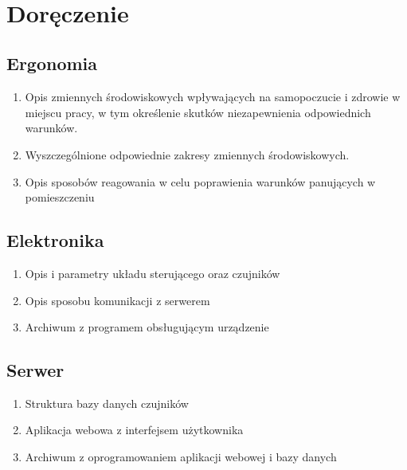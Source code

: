 \documentclass[10pt, a4paper]{article}
\begin{document}
\hspace{-50px}
\begin{ganttchart}{1}{28}
 \\
 \\
 \\
 \\
 \\
 \\
\end{ganttchart}


\section{Doręczenie}

\subsection{Ergonomia}
	\begin{enumerate}
	\item Opis zmiennych środowiskowych wpływających na samopoczucie i zdrowie w miejscu pracy, w tym określenie skutków niezapewnienia odpowiednich warunków.
	\item Wyszczególnione odpowiednie zakresy zmiennych środowiskowych.
	\item Opis sposobów reagowania w celu poprawienia warunków panujących w pomieszczeniu
	\end{enumerate}
\subsection{Elektronika}
	\begin{enumerate}
	\item Opis i parametry układu sterującego oraz czujników
	\item Opis sposobu komunikacji z serwerem
	\item Archiwum z programem obsługującym urządzenie
	\end{enumerate}
\subsection{Serwer}
	\begin{enumerate}
	\item Struktura bazy danych czujników
	\item Aplikacja webowa z interfejsem użytkownika
	\item Archiwum z oprogramowaniem aplikacji webowej i bazy danych
	\end{enumerate}
\end{document}
